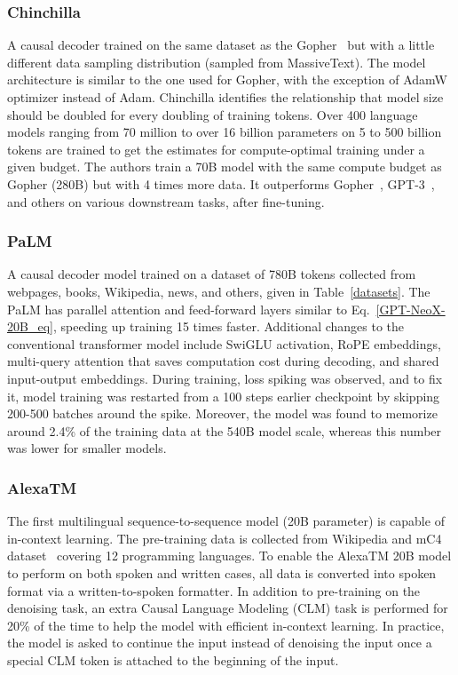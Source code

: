\subsubsection{Chinchilla~\cite{chinchilla}}
A causal decoder trained on the same dataset as the Gopher~\cite{gopher} but with a little different data sampling distribution (sampled from MassiveText). The model architecture is similar to the one used for Gopher, with the exception of AdamW optimizer instead of Adam. Chinchilla identifies the relationship that model size should be doubled for every doubling of training tokens. Over 400 language models ranging from 70 million to over 16 billion parameters on 5 to 500 billion tokens are trained to get the estimates for compute-optimal training under a given budget. The authors train a 70B model with the same compute budget as Gopher (280B) but with 4 times more data. It outperforms Gopher~\cite{gopher}, GPT-3~\cite{GPT-3}, and others on various downstream tasks, after fine-tuning. 


\subsubsection{PaLM}
A causal decoder model trained on a dataset of 780B tokens collected from webpages, books, Wikipedia, news, and others, given in Table~\ref{datasets}. The PaLM has parallel attention and feed-forward layers similar to Eq.~\ref{GPT-NeoX-20B_eq}, speeding up training 15 times faster. Additional changes to the conventional transformer model include SwiGLU activation, RoPE embeddings, multi-query attention that saves computation cost during decoding, and shared input-output embeddings. During training, loss spiking was observed, and to fix it, model training was restarted from a 100 steps earlier checkpoint by skipping 200-500 batches around the spike. Moreover, the model was found to memorize around 2.4\% of the training data at the 540B model scale, whereas this number was lower for smaller models.   

\subsubsection{AlexaTM~\cite{soltan2022alexatm}}
The first multilingual sequence-to-sequence model (20B parameter) is capable of in-context learning. The pre-training data is collected from Wikipedia and mC4 dataset~\cite{mT5} covering 12 programming languages. To enable the AlexaTM 20B model to perform on both spoken and written cases, all data is converted into spoken format via a written-to-spoken formatter. In addition to pre-training on the denoising task, an extra Causal Language Modeling (CLM) task is performed for 20\% of the time to help the model with efficient in-context learning. In practice, the model is asked to continue the input instead of denoising the input once a special CLM token is attached to the beginning of the input.

